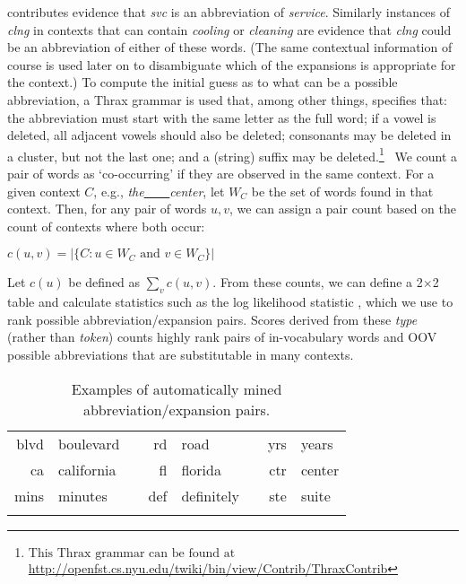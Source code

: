 \documentclass[11pt]{article}
\begin{document}
\noindent contributes evidence that \emph{svc} is an abbreviation of
\emph{service}. Similarly instances of \emph{clng} in contexts that can contain
\emph{cooling} or \emph{cleaning} are evidence that \emph{clng} could be an
abbreviation of either of these words. (The same contextual information of
course is used later on to disambiguate which of the expansions is appropriate
for the context.)  To compute the initial guess as to what can be a possible
abbreviation, a Thrax grammar \cite{Roark:EtAl:12} is used that, among other
things, specifies that: the abbreviation must start with the same letter as the
full word; if a vowel is deleted, all adjacent vowels should also be deleted;
consonants may be deleted in a cluster, but not the last one; and a (string)
suffix may be deleted.\footnote{$\mbox{This Thrax grammar can be found
    at}$\linebreak
  {\footnotesize \url{http://openfst.cs.nyu.edu/twiki/bin/view/Contrib/ThraxContrib}}}~ We count a
pair of words as `co-occurring' if they are observed in the same context.  For a
given context $C$, e.g., \emph{the\underline{~~~~}center}, let $W_C$ be the set
of words found in that context.  Then, for any pair of words $u, v$, we can
assign a pair count based on the count of contexts where both occur:
\begin{center}
$c(u,v) = |\{ C : u \in W_C \mbox{~and~} v\in W_C\}|$\\
\end{center}
Let $c(u)$ be defined as $\sum_{v} c(u, v)$.  From these counts, we can define a
2$\times$2 table and calculate statistics such as the log likelihood statistic
\cite{dunning1993}, which we use to rank possible abbreviation/expansion pairs.
Scores derived from these {\it type\/} (rather than {\it token\/})
counts highly rank pairs of
in-vocabulary words and OOV possible abbreviations that are substitutable in
many contexts.

\begin{table}[t]
\begin{center}
{\small
\begin{tabular}{r@{~~}l@{}c@{}r@{~~}l@{}c@{}r@{~~}l}
blvd & boulevard &\hspace*{0.25in}& rd & road &\hspace*{0.25in}& yrs & years \\
ca & california && fl & florida & &ctr & center \\
mins & minutes && def & definitely && ste & suite \\
\vspace{-0.3in}
\end{tabular} } %
\end{center}
\caption{\small \label{tab:exx}Examples of automatically mined
  abbreviation/expansion pairs.}\vspace{-0.1in}
\end{table}
\end{document}
